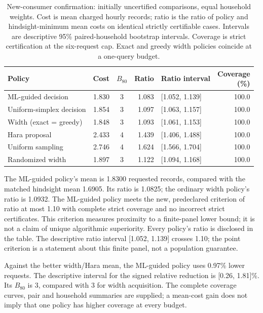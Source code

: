 \documentclass[12pt]{article}
\begin{document}
\begin{table}[htbp]
\centering\small\setlength{\tabcolsep}{4pt}
\caption{New-consumer confirmation: initially uncertified comparisons,
equal household weights. Cost is mean charged hourly records; ratio is the
ratio of policy and hindsight-minimum mean costs on identical strictly
certifiable cases. Intervals are descriptive 95\% paired-household bootstrap
intervals. Coverage is strict certification at the six-request cap.
Exact and greedy width policies coincide at a one-query budget.}
\label{tab:decision-confirmation}
\begin{tabular}{lrc rlr}
\toprule
Policy & Cost & $B_{80}$ & Ratio & Ratio interval & \shortstack{Coverage\\(\%)}\\
\midrule
ML-guided decision & 1.830 & 3 & 1.083 & [1.052, 1.139] & 100.0\\
Uniform-simplex decision & 1.854 & 3 & 1.097 & [1.063, 1.157] & 100.0\\
Width (exact = greedy) & 1.848 & 3 & 1.093 & [1.061, 1.153] & 100.0\\
Hara proposal & 2.433 & 4 & 1.439 & [1.406, 1.488] & 100.0\\
Uniform sampling & 2.746 & 4 & 1.624 & [1.566, 1.704] & 100.0\\
Randomized width & 1.897 & 3 & 1.122 & [1.094, 1.168] & 100.0\\
\bottomrule
\end{tabular}
\end{table}

The ML-guided policy's mean is 1.8300 requested records,
compared with the matched hindsight mean
1.6905. Its ratio is
1.0825; the ordinary width policy's ratio is
1.0932. The ML-guided policy meets the
new, predeclared criterion of ratio at most 1.10 with complete strict
coverage and no incorrect strict certificates. This criterion measures
proximity to a finite-panel lower bound; it is not a claim of unique
algorithmic superiority. Every policy's ratio is disclosed in the table.
The descriptive ratio interval [1.052, 1.139] crosses 1.10; the point criterion is a statement about this finite panel, not a population guarantee.

Against the better width/Hara mean, the ML-guided policy uses
0.97\% lower requests. The descriptive interval
for the signed relative reduction is [0.26, 1.81]\%.
Its $B_{80}$ is 3, compared with
3 for width acquisition. The complete coverage curves,
pair and household summaries are supplied; a mean-cost gain does not imply
that one policy has higher coverage at every budget.
\end{document}
